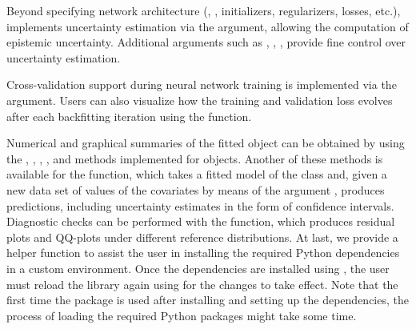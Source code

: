 Beyond specifying network architecture (, , initializers, regularizers, losses, etc.),  implements uncertainty estimation via the  argument, allowing the computation of epistemic uncertainty. Additional arguments such as , , , provide fine control over uncertainty estimation.

Cross-validation support during neural network training is implemented via the  argument. Users can also visualize how the training and validation loss evolves after each backfitting iteration using the  function.

Numerical and graphical summaries of the fitted object can be obtained by using the , , , ,  and  methods implemented for  objects. Another of these methods is available for the  function, which takes a fitted model of the  class and, given a new data set of values of the covariates by means of the argument , produces predictions, including uncertainty estimates in the form of confidence intervals. Diagnostic checks can be performed with the  function, which produces residual plots and QQ-plots under different reference distributions. At last, we provide a helper function  to assist the user in installing the required Python dependencies in a custom  environment. Once the dependencies are installed using , the user must reload the library again using  for the changes to take effect. Note that the first time the package is used after installing and setting up the dependencies, the process of loading the required Python packages might take some time.

